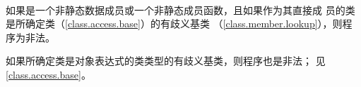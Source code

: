 \paragraph{} %
如果是一个非静态数据成员或一个非静态成员函数，且如果作为其直接成
员的类是所确定类（\ref{class.access.base}）的有歧义基类
（\ref{class.member.lookup}），则程序为非法。

\begin{note}
  如果所确定类是对象表达式的类类型的有歧义基类，则程序也是非法；
  见\ref{class.access.base}。
\end{note}
